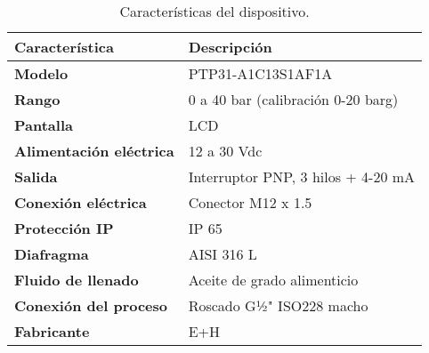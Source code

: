 \begin{table}[H]
    \centering
    \caption{Características del dispositivo.}
    \label{table:dispositivo}
    \begin{tabular}{| L{5cm} | L{5cm} |}
        \hline
        \textbf{Característica} & \textbf{Descripción}  \\
        \hline
        \textbf{Modelo} & PTP31-A1C13S1AF1A  \\
        \hline
        \textbf{Rango} & 0 a 40 bar (calibración 0-20 barg)  \\
        \hline
        \textbf{Pantalla} & LCD  \\
        \hline
        \textbf{Alimentación eléctrica} & 12 a 30 Vdc  \\
        \hline
        \textbf{Salida} & Interruptor PNP, 3 hilos + 4-20 mA  \\
        \hline
        \textbf{Conexión eléctrica} & Conector M12 x 1.5  \\
        \hline
        \textbf{Protección IP} & IP 65  \\
        \hline
        \textbf{Diafragma} & AISI 316 L  \\
        \hline
        \textbf{Fluido de llenado} & Aceite de grado alimenticio  \\
        \hline
        \textbf{Conexión del proceso} & Roscado G½" ISO228 macho  \\
        \hline
        \textbf{Fabricante} & E+H  \\
        \hline
    \end{tabular}
\end{table}

